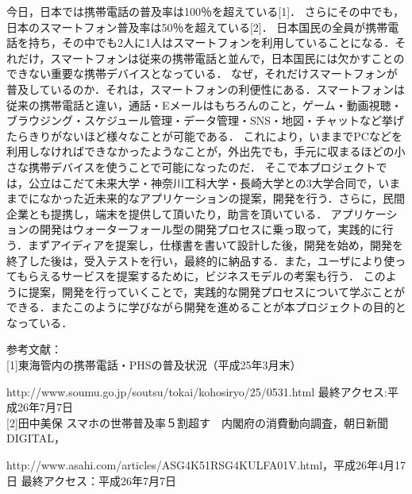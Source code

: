 \begin{jabstract}
今日，日本では携帯電話の普及率は100％を超えている[1]． さらにその中でも，日本のスマートフォン普及率は50％を超えている[2]． 日本国民の全員が携帯電話を持ち，その中でも2人に1人はスマートフォンを利用していることになる．それだけ，スマートフォンは従来の携帯電話と並んで，日本国民には欠かすことのできない重要な携帯デバイスとなっている．
なぜ，それだけスマートフォンが普及しているのか．それは，スマートフォンの利便性にある．スマートフォンは従来の携帯電話と違い，通話・Eメールはもちろんのこと，ゲーム・動画視聴・ブラウジング・スケジュール管理・データ管理・SNS・地図・チャットなど挙げたらきりがないほど様々なことが可能である．
これにより，いままでPCなどを利用しなければできなかったようなことが，外出先でも，手元に収まるほどの小さな携帯デバイスを使うことで可能になったのだ．
そこで本プロジェクトでは，公立はこだて未来大学・神奈川工科大学・長崎大学との3大学合同で，いままでになかった近未来的なアプリケーションの提案，開発を行う．さらに，民間企業とも提携し，端末を提供して頂いたり，助言を頂いている．
アプリケーションの開発はウォーターフォール型の開発プロセスに乗っ取って，実践的に行う．まずアイディアを提案し，仕様書を書いて設計した後，開発を始め，開発を終了した後は，受入テストを行い，最終的に納品する．また，ユーザにより使ってもらえるサービスを提案するために，ビジネスモデルの考案も行う．
このように提案，開発を行っていくことで，実践的な開発プロセスについて学ぶことができる．またこのように学びながら開発を進めることが本プロジェクトの目的となっている．

参考文献：\\[1mm]
[1]東海管内の携帯電話・PHSの普及状況（平成25年3月末）
\par 
http://www.soumu.go.jp/soutsu/tokai/kohosiryo/25/0531.html
最終アクセス:平成26年7月7日
\\[1mm] 
[2]田中美保 スマホの世帯普及率５割超す　内閣府の消費動向調査，朝日新聞DIGITAL，
\par
http://www.asahi.com/articles/ASG4K51RSG4KULFA01V.html，平成26年4月17日 最終アクセス：平成26年7月7日

\end{jabstract}

